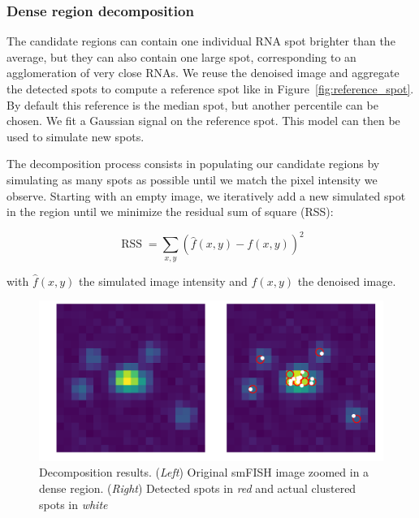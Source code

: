 \subsubsection{Dense region decomposition}

The candidate regions can contain one individual \ac{RNA} spot brighter than the average, but they can also contain one large spot, corresponding to an agglomeration of very close \ac{RNA}s.
We reuse the denoised image and aggregate the detected spots to compute a reference spot like in Figure~\ref{fig:reference_spot}.
By default this reference is the median spot, but another percentile can be chosen.
We fit a Gaussian signal on the reference spot.
This model can then be used to simulate new spots.

The decomposition process consists in populating our candidate regions by simulating as many spots as possible until we match the pixel intensity we observe.
Starting with an empty image, we iteratively add a new simulated spot in the region until we minimize the residual sum of square (RSS):

\begin{equation}
	{\displaystyle \operatorname{RSS} = \sum _{x, y}(\hat{f}(x, y) - f(x, y))^{2}}
\end{equation}

\noindent
with $\hat{f}(x, y)$ the simulated image intensity and $f(x, y)$ the denoised image.

\begin{figure}[]
    \centering
    \includegraphics[width=1\textwidth]{figures/chapter2/plot_dense_decomposition}
    \caption[Example of dense region decomposition]{Decomposition results.
	(\textit{Left}) Original smFISH image zoomed in a dense region.
	(\textit{Right}) Detected spots in \textit{red} and actual clustered spots in \textit{white}}
    \label{fig:dense_decomposition}
\end{figure}

